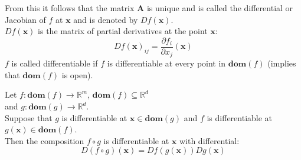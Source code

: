         From this it follows that the matrix $\mathbf{A}$ is unique and is called the differential or Jacobian of $f$ at $\mathbf{x}$ and is denoted by $D f(\mathbf{x})$.\\
        $D f(\mathbf{x})$ is the matrix of partial derivatives at the point $\mathbf{x}$:
        \begin{equation*}
            D f(\mathbf{x})_{ij} = \frac{\partial f_i}{\partial x_j} (\mathbf{x})
        \end{equation*}
        $f$ is called differentiable if $f$ is differentiable at every point in $\mathbf{dom}(f)$ (implies that $\mathbf{dom}(f)$ is open).

        Let $f: \mathbf{dom}(f) \rightarrow \mathbb{R}^m$, $\mathbf{dom}(f) \subseteq \mathbb{R}^d$\\
        and $g: \mathbf{dom}(g) \rightarrow \mathbb{R}^d$.\\
        Suppose that $g$ is differentiable at $\mathbf{x} \in \mathbf{dom}(g)$ and $f$ is differentiable at $g(\mathbf{x}) \in \mathbf{dom}(f)$.\\ 
        Then the composition $f \circ g$ is differentiable at $\mathbf{x}$ with differential:
        \begin{equation*}
            D(f \circ g)(\mathbf{x}) = D f(g(\mathbf{x})) D g(\mathbf{x})
        \end{equation*}